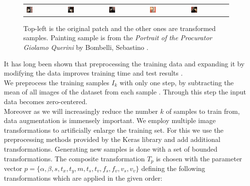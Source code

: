 \begin{figure}[htb]
\begin{tabularx}{\textwidth}{XXXXX}
        \includegraphics[width=0.170\textwidth]{figures/aug/parts_example_6} &
        \includegraphics[width=0.170\textwidth]{figures/aug/parts_example_7} &
        \includegraphics[width=0.170\textwidth]{figures/aug/parts_example_8} &
        \includegraphics[width=0.170\textwidth]{figures/aug/parts_example_9} &
        \includegraphics[width=0.170\textwidth]{figures/aug/parts_example_10}
    \end{tabularx}
	\caption{Top-left is the original patch and the other ones are transformed samples. Painting sample is from the \textit{Portrait of the Procurator Giolamo Querini} by Bombelli, Sebastino \citep{bombelli_retrato_1669}.}
    \label{fig:augmentation}
\end{figure}
It has long been shown that preprocessing the training data and expanding it by modifying the data improves training time and test results \citep{dosovitskiy_discriminative_2014}.\\
We preprocess the training samples $I_k$ with only one step, by subtracting the mean of all images of the dataset from each sample \citep{krizhevsky_imagenet_2012}. Through this step the input data becomes zero-centered.\\
Moreover as we will increasingly reduce the number $k$ of samples to train from, data augmentation is immensely important.  We employ multiple image transformations to artificially enlarge the training set. For this we use the preprocessing methods provided by the Keras library \citep{chollet_keras:_2015} and add additional transformations. Generating new samples is done with a set of bounded transformations. The composite transformation $T_p$ is chosen with the parameter vector $p = \{\alpha, \beta, s, t_x, t_y, m, t_s, t_v, f_s, f_v, v_s, v_v\}$ defining the following transformations which are applied in the given order:
